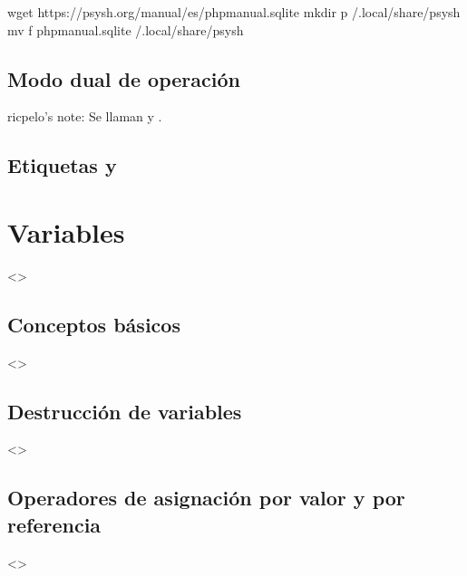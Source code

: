 \documentclass[a4paper,12pt,spanish]{sphinxmanual}
\begin{document}
%
\begin{sphinxVerbatim}[commandchars=\\\{\}]
 wget https://psysh.org/manual/es/php\PYGZus{}manual.sqlite
 mkdir \PYGZhy{}p \PYGZti{}/.local/share/psysh
 mv \PYGZhy{}f php\PYGZus{}manual.sqlite \PYGZti{}/.local/share/psysh
\end{sphinxVerbatim}


\subsection{Modo dual de operación}
\label{\detokenize{php:modo-dual-de-operacion}}
ricpelo’s note: Se llaman  y .


\subsection{Etiquetas  y }
\label{\detokenize{php:etiquetas-php-y}}

\section{Variables}
\label{\detokenize{php:variables}}
\textless{}\textgreater{}


\subsection{Conceptos básicos}
\label{\detokenize{php:conceptos-basicos}}
\textless{}\textgreater{}


\subsection{Destrucción de variables}
\label{\detokenize{php:destruccion-de-variables}}
\textless{}\textgreater{}


\subsection{Operadores de asignación por valor y por referencia}
\label{\detokenize{php:operadores-de-asignacion-por-valor-y-por-referencia}}
\textless{}\textgreater{}
\end{document}
